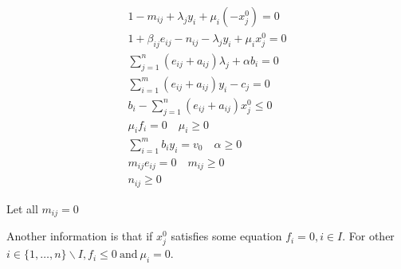 \documentclass[UTF8]{article}
\begin{document}
\begin{align*}
  1 - m_{ij}+\lambda_j y_i + \mu_i(-x_j^0) = 0  \\
  1+ \beta_{ij} e_{ij} - n_{ij}-\lambda_j y_i + \mu_i x_j^0 = 0   \\
  \sum_{j=1}^n(e_{ij}+a_{ij})\lambda_j + \alpha b_i = 0 \\
  \sum_{i=1}^m (e_{ij}+a_{ij})y_i-c_j = 0 \\
  b_i - \sum_{j=1}^n (e_{ij}+a_{ij})x_j^0 \leq 0 \\
  \mu_i f_i = 0 \quad \mu_i \geq 0 \\
  \sum_{i=1}^m b_i y_i = v_0 \quad \alpha \geq 0 \\
  m_{ij} e_{ij} =0 \quad m_{ij} \geq 0 \\
  n_{ij} \geq 0
\end{align*}

Let all $m_{ij} = 0$

Another information is that if $x_j^0$ satisfies some equation
$f_i = 0, i \in I$. For other $i \in \{1,\dots,n\}\backslash I, f_i\leq 0 ~\text{and}~ \mu_i = 0$.
\end{document}
